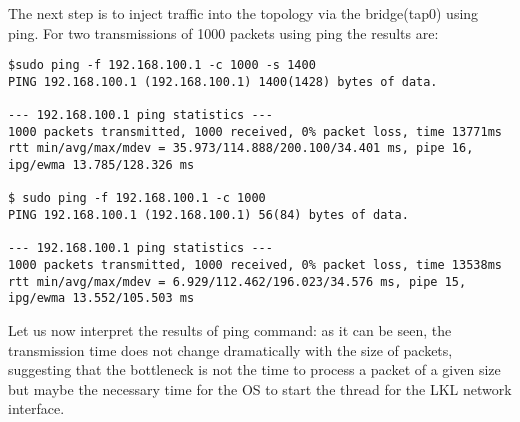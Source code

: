 The next step is to inject traffic into the topology via the bridge(tap0) using ping.
For two transmissions of 1000 packets using ping the results are:
\lstset{language=Tex, caption=}
\begin{lstlisting}
$sudo ping -f 192.168.100.1 -c 1000 -s 1400
PING 192.168.100.1 (192.168.100.1) 1400(1428) bytes of data.
                
--- 192.168.100.1 ping statistics ---
1000 packets transmitted, 1000 received, 0% packet loss, time 13771ms
rtt min/avg/max/mdev = 35.973/114.888/200.100/34.401 ms, pipe 16, ipg/ewma 13.785/128.326 ms

$ sudo ping -f 192.168.100.1 -c 1000 
PING 192.168.100.1 (192.168.100.1) 56(84) bytes of data.
               
--- 192.168.100.1 ping statistics ---
1000 packets transmitted, 1000 received, 0% packet loss, time 13538ms
rtt min/avg/max/mdev = 6.929/112.462/196.023/34.576 ms, pipe 15, ipg/ewma 13.552/105.503 ms
\end{lstlisting}
Let us now interpret the results of ping command:
as it can be seen, the transmission time does not change dramatically with the size of packets, suggesting that the bottleneck is not the time to process a packet of a given size but maybe the necessary time for the OS to start the thread for the LKL network interface.
